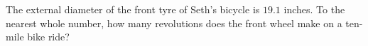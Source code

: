 The external diameter of the front tyre of Seth's bicycle is $19.1$ inches. To the nearest whole number, how many revolutions does the front wheel make on a ten-mile bike ride?

